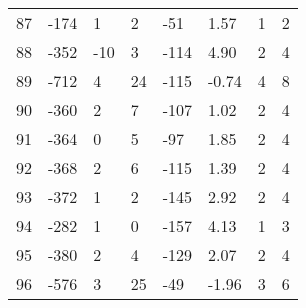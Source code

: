 \begin{appendices}
\begin{longtable}[c]{@{}llllllll@{}}
	87                       & -174                          & 1                            & 2                            & -51                      & 1.57                    & 1                    & 2                       \\
	88                       & -352                          & -10                          & 3                            & -114                     & 4.90                    & 2                    & 4                       \\
	89                       & -712                          & 4                            & 24                           & -115                     & -0.74                   & 4                    & 8                       \\
	90                       & -360                          & 2                            & 7                            & -107                     & 1.02                    & 2                    & 4                       \\
	91                       & -364                          & 0                            & 5                            & -97                      & 1.85                    & 2                    & 4                       \\
	92                       & -368                          & 2                            & 6                            & -115                     & 1.39                    & 2                    & 4                       \\
	93                       & -372                          & 1                            & 2                            & -145                     & 2.92                    & 2                    & 4                       \\
	94                       & -282                          & 1                            & 0                            & -157                     & 4.13                    & 1                    & 3                       \\
	95                       & -380                          & 2                            & 4                            & -129                     & 2.07                    & 2                    & 4                       \\
	96                       & -576                          & 3                            & 25                           & -49                      & -1.96                   & 3                    & 6                       \\

\end{longtable}
\end{appendices}

